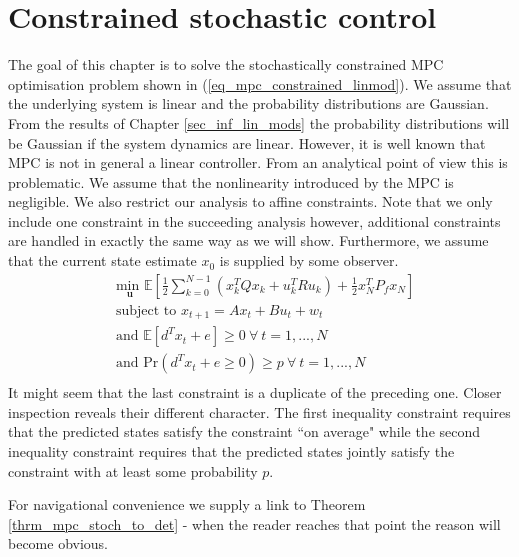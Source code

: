 \section{Constrained stochastic control}
\label{sec_lin_mpc_constained}
The goal of this chapter is to solve the stochastically constrained MPC optimisation problem shown in (\ref{eq_mpc_constrained_linmod}). We assume that the underlying system is linear and the probability distributions are Gaussian. From the results of Chapter \ref{sec_inf_lin_mods} the probability distributions will be Gaussian if the system dynamics are linear. However, it is well known \cite{mac} that MPC is not in general a linear controller. From an analytical point of view this is problematic. We assume that the nonlinearity introduced by the MPC is negligible. We also restrict our analysis to affine constraints. Note that we only include one constraint in the succeeding analysis however, additional constraints are handled in exactly the same way as we will show. Furthermore, we assume that the current state estimate $x_0$ is supplied by some observer.
\begin{equation}
\begin{aligned}
&\underset{\mathbf{u}}{\text{min }} \mathbb{E}\left[ \frac{1}{2}\sum_{k=0}^{N-1} \left( x_k^TQx_k + u_k^TRu_k \right) + \frac{1}{2}x_N^TP_fx_N \right] \\
& \text{subject to } x_{t+1}=Ax_t+Bu_t + w_t \\
& \text{and } \mathbb{E}[d^Tx_t + e] \geq 0 ~\forall ~t=1,...,N \\
& \text{and } \text{Pr}(d^Tx_t + e \geq 0) \geq p ~\forall ~t=1,...,N\\
\end{aligned}
\label{eq_mpc_constrained_linmod}
\end{equation}
It might seem that the last constraint is a duplicate of the preceding one. Closer inspection reveals their different character. The first inequality constraint requires that the predicted states satisfy the constraint ``on average" while the second inequality constraint requires that the predicted states jointly satisfy the constraint with at least some probability $p$. 

For navigational convenience we supply a link to Theorem \ref{thrm_mpc_stoch_to_det} - when the reader reaches that point the reason will become obvious.

